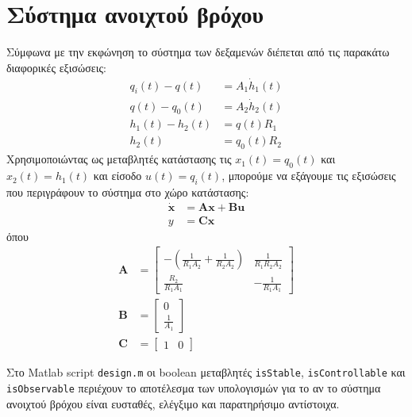\documentclass[a4paper, 11pt, english, greek]{article}
\begin{document}
\section{Σύστημα ανοιχτού βρόχου}
Σύμφωνα με την εκφώνηση το σύστημα των δεξαμενών διέπεται από τις παρακάτω διαφορικές εξισώσεις:
\begin{equation}
  \begin{split}
  	\label{eq:dif}
	q_i(t)-q(t) &= A_1 \dot{h}_1(t)\\
	q(t)-q_0(t) &= A_2 \dot{h}_2(t)\\
	h_1(t) - h_2(t) &= q(t) R_1\\
	h_2(t) &= q_0(t) R_2
  \end{split}
\end{equation}
Χρησιμοποιώντας ως μεταβλητές κατάστασης τις $x_1(t)=q_0(t)$ και $x_2(t)=h_1(t)$ και είσοδο $u(t) = q_i(t)$,
μπορούμε να εξάγουμε τις εξισώσεις που περιγράφουν το σύστημα στο χώρο κατάστασης:
\begin{equation}
  \begin{split}
  	\label{eq:ss}
  	\dot{\mathbf{x}} &= \mathbf{A}\mathbf{x} + \mathbf{B}\mathbf{u}\\
    y &= \mathbf{C}\mathbf{x}
  \end{split}
\end{equation}
όπου
\begin{equation}
  \label{eq:mat}
  \begin{split}
    \mathbf{A} &=
  	\begin{bmatrix}
      -(\frac{\displaystyle 1}{\displaystyle R_1 A_2} + \frac{\displaystyle 1}{\displaystyle R_2 A_2}) &
      \frac{\displaystyle 1}{\displaystyle R_1 R_2 A_2} \\
      \frac{\displaystyle R_2}{\displaystyle R_1 A_1} &
      -\frac{\displaystyle 1}{\displaystyle R_1 A_1}
    \end{bmatrix}\\
    \mathbf{B} &=
    \begin{bmatrix}
      0\\
      \frac{\displaystyle 1}{\displaystyle A_1}
    \end{bmatrix}\\
    \mathbf{C} &=
    \begin{bmatrix}
      1 & 0
    \end{bmatrix}
  \end{split}
\end{equation}

Στο \textlatin{Matlab script} \textlatin{\texttt{design.m}} οι \textlatin{boolean} μεταβλητές
\textlatin{\texttt{isStable}}, \textlatin{\texttt{isControllable}} και \textlatin{\texttt{isObservable}}
περιέχουν το αποτέλεσμα των υπολογισμών για το αν το σύστημα ανοιχτού βρόχου είναι
ευσταθές, ελέγξιμο και παρατηρήσιμο αντίστοιχα.
\end{document}
